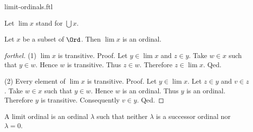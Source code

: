 \documentclass{naproche-library}
\begin{document}
\begin{smodule}[title=Limit Ordinals]{limit-ordinals.ftl}

\begin{forthel}
  Let $\lim x$ stand for $\bigcup x$.
\end{forthel}

\begin{proposition}[forthel,id=SET_THEORY_02_7202164443185152]
  Let $x$ be a subset of $\Ord$.
  Then $\lim x$ is an ordinal.
\end{proposition}
\begin{proof}[forthel]
  (1) $\lim x$ is transitive. \newline
  Proof.
    Let $y \in \lim x$ and $z \in y$.
    Take $w \in x$ such that $y \in w$.
    Hence $w$ is transitive.
    Thus $z \in w$.
    Therefore $z \in \lim x$.
  Qed.

  (2) Every element of $\lim x$ is transitive. \newline
  Proof.
    Let $y \in \lim x$.
    Let $z \in y$ and $v \in z$.
    Take $w \in x$ such that $y \in w$.
    Hence $w$ is an ordinal.
    Thus $y$ is an ordinal.
    Therefore $y$ is transitive.
    Consequently $v \in y$.
  Qed.
\end{proof}

\begin{definition}[forthel,id=SET_THEORY_02_7678388934279168]
  A limit ordinal is an ordinal $\lambda$ such that neither $\lambda$ is a successor ordinal nor $\lambda = 0$.
\end{definition}
\end{smodule}
\end{document}
